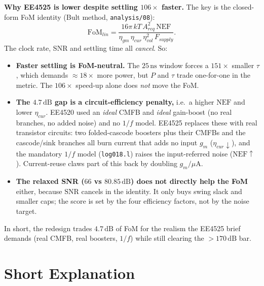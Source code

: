 \documentclass[11pt]{article}
\begin{document}
\medskip
\noindent\textbf{Why EE4525 is lower despite settling $106\times$ faster.} The key is the
closed-form FoM identity (Bult method, \texttt{analysis/08}):
\[
\mathrm{FoM}_{lin}=\frac{16\pi\,kT\,A_{req}^2\,\mathrm{NEF}}
{\eta_{gm}\,\eta_{cur}\,\eta_{vol}^2\,F_{supply}}.
\]
The clock rate, SNR and settling time all \emph{cancel}. So:
\begin{itemize}
\item \textbf{Faster settling is FoM-neutral.} The $25\,\mathrm{ns}$ window forces a
$151\times$ smaller $\tau$, which demands $\approx18\times$ more power, but $P$ and $\tau$
trade one-for-one in the metric. The $106\times$ speed-up alone does \emph{not} move the FoM.
\item \textbf{The $4.7\,\mathrm{dB}$ gap is a circuit-efficiency penalty,} i.e.\ a higher
$\mathrm{NEF}$ and lower $\eta_{cur}$. EE4520 used an \emph{ideal} CMFB and \emph{ideal}
gain-boost (no real branches, no added noise) and no $1/f$ model. EE4525 replaces these
with real transistor circuits: two folded-cascode boosters plus their CMFBs and the
cascode/sink branches all burn current that adds no input $g_m$ ($\eta_{cur}\downarrow$),
and the mandatory $1/f$ model (\texttt{log018.l}) raises the input-referred noise
($\mathrm{NEF}\uparrow$). Current-reuse claws part of this back by doubling $g_m/\mu\mathrm{A}$.
\item \textbf{The relaxed SNR ($66$ vs $80.85\,\mathrm{dB}$) does not directly help the FoM}
either, because $\mathrm{SNR}$ cancels in the identity. It only buys swing slack and smaller
caps; the score is set by the four efficiency factors, not by the noise target.
\end{itemize}
\noindent In short, the redesign trades $4.7\,\mathrm{dB}$ of FoM for the realism the
EE4525 brief demands (real CMFB, real boosters, $1/f$) while still clearing the
$>170\,\mathrm{dB}$ bar.
\clearpage

\section*{Short Explanation}
\end{document}
